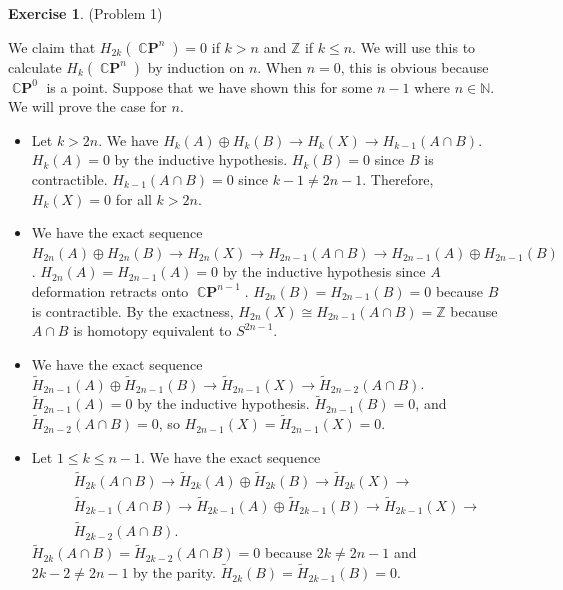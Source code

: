 \documentclass[psamsfonts]{amsart}
\theoremstyle{definition}
\newtheorem*{exer}{Exercise}
\theoremstyle{remark}
\DeclareMathOperator{\CP}{\mathbb{C}\mathbf{P}}
\numberwithin{equation}{section}
\begin{document}
\begin{exer}{(Problem 1)}
\begin{itemize}
       We claim that $H_{2k}(\CP^n) = 0$ if $k > n$ and $\mathbb{Z}$ if $k \leq n$.
       We will use this to calculate $H_k(\CP^n)$ by induction on $n$.
       When $n = 0$, this is obvious because $\CP^0$ is a point.
       Suppose that we have shown this for some $n - 1$ where $n \in \mathbb{N}$.
       We will prove the case for $n$.
       \begin{itemize}
         \item
           Let $k > 2n$.
           We have $H_{k}(A) \oplus H_k(B) \rightarrow H_k(X) \rightarrow H_{k - 1}(A \cap B)$.
           $H_k(A) = 0$ by the inductive hypothesis.
           $H_k(B) = 0$ since $B$ is contractible.
           $H_{k - 1}(A \cap B) = 0$ since $k - 1 \ne 2n - 1$.
           Therefore, $H_k(X) = 0$ for all $k > 2n$.
         \item
           We have the exact sequence $H_{2n}(A) \oplus H_{2n}(B) \rightarrow H_{2n}(X) \rightarrow H_{2n - 1}(A \cap B) \rightarrow H_{2n - 1}(A) \oplus H_{2n - 1}(B)$.
           $H_{2n}(A) = H_{2n - 1}(A) = 0$ by the inductive hypothesis since $A$ deformation retracts onto $\CP^{n - 1}$.
           $H_{2n}(B) = H_{2n - 1}(B) = 0$ because $B$ is contractible.
           By the exactness, $H_{2n}(X) \cong H_{2n - 1}(A \cap B) = \mathbb{Z}$ because $A \cap B$ is homotopy equivalent to $S^{2n - 1}$.
         \item
           We have the exact sequence $\tilde{H}_{2n - 1}(A) \oplus \tilde{H}_{2n - 1}(B) \rightarrow \tilde{H}_{2n - 1}(X) \rightarrow \tilde{H}_{2n - 2}(A \cap B)$.
           $\tilde{H}_{2n - 1}(A) = 0$ by the inductive hypothesis.
           $\tilde{H}_{2n - 1}(B) = 0$, and $\tilde{H}_{2n - 2}(A \cap B) = 0$, so $H_{2n - 1}(X) = \tilde{H}_{2n - 1}(X) = 0$.
         \item
          Let $1 \leq k \leq n - 1$.
          We have the exact sequence
          \begin{align*}
            &\tilde{H}_{2k}(A \cap B) \rightarrow \tilde{H}_{2k}(A) \oplus \tilde{H}_{2k}(B) \rightarrow \tilde{H}_{2k}(X) \rightarrow \\
            &\tilde{H}_{2k - 1}(A \cap B) \rightarrow \tilde{H}_{2k - 1}(A) \oplus \tilde{H}_{2k - 1}(B) \rightarrow \tilde{H}_{2k - 1}(X) \rightarrow \\
            &\tilde{H}_{2k - 2}(A \cap B).
          \end{align*}
          $\tilde{H}_{2k}(A \cap B) = \tilde{H}_{2k - 2}(A \cap B) = 0$ because $2k \ne 2n - 1$ and $2k - 2 \ne 2n - 1$ by the parity.
          $\tilde{H}_{2k}(B) = \tilde{H}_{2k - 1}(B) = 0$.

\end{itemize}
\end{itemize}
\end{exer}
\end{document}
